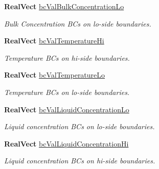 \begin{DoxyCompactItemize}
\mbox{\label{class_mushy_layer_params_a06f2d284d0ad84792bc599a7cdf540e7}} 
\textbf{ Real\+Vect} \hyperlink{class_mushy_layer_params_a06f2d284d0ad84792bc599a7cdf540e7}{bc\+Val\+Bulk\+Concentration\+Lo}
\begin{DoxyCompactList}\small\item\em Bulk Concentration B\+Cs on lo-\/side boundaries. \end{DoxyCompactList}\item 
\mbox{\label{class_mushy_layer_params_a7fb0967406b3327327e5173fce438576}} 
\textbf{ Real\+Vect} \hyperlink{class_mushy_layer_params_a7fb0967406b3327327e5173fce438576}{bc\+Val\+Temperature\+Hi}
\begin{DoxyCompactList}\small\item\em Temperature B\+Cs on hi-\/side boundaries. \end{DoxyCompactList}\item 
\mbox{\label{class_mushy_layer_params_ae51b5d35b60e2a82d430bf98fc8ddbd8}} 
\textbf{ Real\+Vect} \hyperlink{class_mushy_layer_params_ae51b5d35b60e2a82d430bf98fc8ddbd8}{bc\+Val\+Temperature\+Lo}
\begin{DoxyCompactList}\small\item\em Temperature B\+Cs on lo-\/side boundaries. \end{DoxyCompactList}\item 
\mbox{\label{class_mushy_layer_params_a85ff36d3793f22046df4837fdf72087c}} 
\textbf{ Real\+Vect} \hyperlink{class_mushy_layer_params_a85ff36d3793f22046df4837fdf72087c}{bc\+Val\+Liquid\+Concentration\+Lo}
\begin{DoxyCompactList}\small\item\em Liquid concentration B\+Cs on lo-\/side boundaries. \end{DoxyCompactList}\item 
\mbox{\label{class_mushy_layer_params_af2cdd1c9f59cdeaf080d45787265f092}} 
\textbf{ Real\+Vect} \hyperlink{class_mushy_layer_params_af2cdd1c9f59cdeaf080d45787265f092}{bc\+Val\+Liquid\+Concentration\+Hi}
\begin{DoxyCompactList}\small\item\em Liquid concentration B\+Cs on hi-\/side boundaries. \end{DoxyCompactList}\item 

\end{DoxyCompactItemize}
